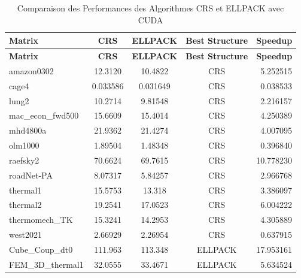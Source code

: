 \documentclass[12pt,oneside]{book} %
\begin{document}
\newpage
\begin{longtable}{lcccr}
    \caption{Comparaison des Performances des Algorithmes CRS et ELLPACK avec CUDA}                  \\
    \toprule
    \textbf{Matrix}   & \textbf{CRS} & \textbf{ELLPACK} & \textbf{Best Structure} & \textbf{Speedup} \\
    \midrule
    \endfirsthead
    \toprule
    \textbf{Matrix}   & \textbf{CRS} & \textbf{ELLPACK} & \textbf{Best Structure} & \textbf{Speedup} \\
    \midrule
    \endhead
    \bottomrule
    \endfoot
    amazon0302        & 12.3120      & 10.4822          & CRS                     & 5.252515         \\
    cage4             & 0.033586     & 0.031649         & CRS                     & 0.038533         \\
    lung2             & 10.2714      & 9.81548          & CRS                     & 2.216157         \\
    mac\_econ\_fwd500 & 15.6609      & 15.4014          & CRS                     & 4.250389         \\
    mhd4800a          & 21.9362      & 21.4274          & CRS                     & 4.007095         \\
    olm1000           & 1.89504      & 1.48348          & CRS                     & 0.396840         \\
    raefsky2          & 70.6624      & 69.7615          & CRS                     & 10.778230        \\
    roadNet-PA        & 8.07317      & 5.84257          & CRS                     & 2.966768         \\
    thermal1          & 15.5753      & 13.318           & CRS                     & 3.386097         \\
    thermal2          & 19.2541      & 17.0523          & CRS                     & 6.004222         \\
    thermomech\_TK    & 15.3241      & 14.2953          & CRS                     & 4.305889         \\
    west2021          & 2.66929      & 2.26954          & CRS                     & 0.637915         \\
    Cube\_Coup\_dt0   & 111.963      & 113.348          & ELLPACK                 & 17.953161        \\
    FEM\_3D\_thermal1 & 32.0555      & 33.4671          & ELLPACK                 & 5.634524         \\

\end{longtable}
\end{document}
